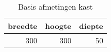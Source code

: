 \begin{table}[h!]
\centering
\caption{Basis afmetingen kast}
\begin{tabular}{rrr}
\toprule
 breedte &  hoogte &  diepte \\
\midrule
     300 &     300 &      50 \\
\bottomrule
\end{tabular}
\end{table}
